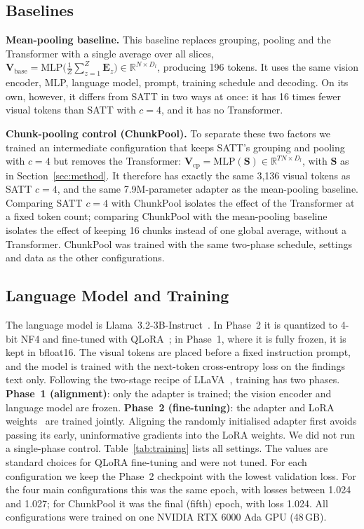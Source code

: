\documentclass[conference]{IEEEtran}
\begin{document}
\subsection{Baselines}
\textbf{Mean-pooling baseline.} This baseline replaces grouping, pooling and
the Transformer with a single average over all slices,
$\mathbf{V}_{\text{base}}=\mathrm{MLP}\big(\tfrac{1}{Z}\sum_{z=1}^{Z}\mathbf{E}_z\big)\in\mathbb{R}^{N\times D_l}$,
producing 196 tokens. It uses the same vision encoder, MLP, language model,
prompt, training schedule and decoding. On its own, however, it differs from
SATT in two ways at once: it has 16 times fewer visual tokens than SATT with
$c=4$, and it has no Transformer.

\textbf{Chunk-pooling control (ChunkPool).} To separate these two factors we
trained an intermediate configuration that keeps SATT's grouping and pooling
with $c=4$ but removes the Transformer:
$\mathbf{V}_{\text{cp}}=\mathrm{MLP}(\mathbf{S})\in\mathbb{R}^{TN\times D_l}$,
with $\mathbf{S}$ as in Section~\ref{sec:method}. It therefore has exactly the
same 3,136 visual tokens as SATT $c=4$, and the same 7.9M-parameter adapter as
the mean-pooling baseline. Comparing SATT $c=4$ with ChunkPool isolates the
effect of the Transformer at a fixed token count; comparing ChunkPool with the
mean-pooling baseline isolates the effect of keeping 16 chunks instead of one
global average, without a Transformer. ChunkPool was trained with the same
two-phase schedule, settings and data as the other configurations.

\subsection{Language Model and Training}
The language model is Llama~3.2-3B-Instruct~\cite{llama3}. In Phase~2 it is
quantized to 4-bit NF4 and fine-tuned with QLoRA~\cite{qlora}; in Phase~1,
where it is fully frozen, it is kept in bfloat16. The visual tokens are placed before a fixed
instruction prompt, and the model is trained with the next-token
cross-entropy loss on the findings text only. Following the two-stage recipe
of LLaVA~\cite{llava,llava15}, training has two phases.
\textbf{Phase~1 (alignment)}: only the adapter is trained; the vision encoder
and language model are frozen. \textbf{Phase~2 (fine-tuning)}: the adapter
and LoRA weights~\cite{lora} are trained jointly. Aligning the randomly
initialised adapter first avoids passing its early, uninformative gradients
into the LoRA weights. We did not run a single-phase control. Table~\ref{tab:training}
lists all settings. The values are standard choices for QLoRA fine-tuning
and were not tuned. For each configuration we keep the Phase~2 checkpoint
with the lowest validation loss. For the four main configurations this was
the same epoch, with losses between 1.024 and 1.027; for ChunkPool it was the
final (fifth) epoch, with loss 1.024. All configurations were trained on one NVIDIA RTX
6000 Ada GPU (48\,GB).
\end{document}

